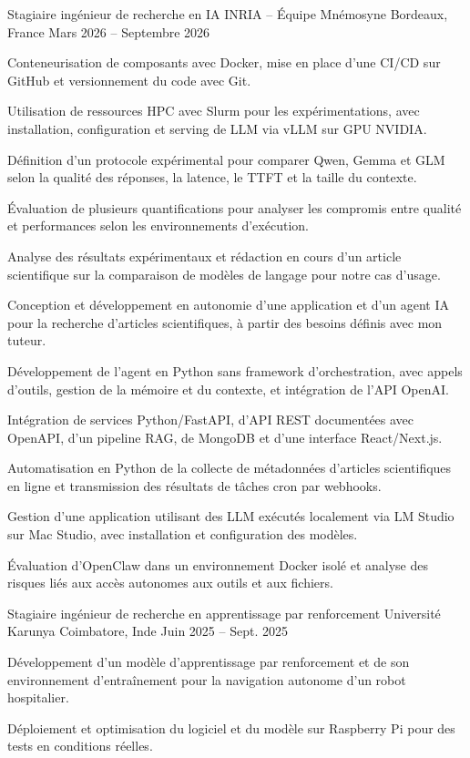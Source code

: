 
\begin{cventries}
  \cventry
    {Stagiaire ingénieur de recherche en IA}
    {INRIA -- Équipe Mnémosyne}
    {Bordeaux, France}
    {Mars 2026 -- Septembre 2026}
    {
      \begin{cvitems}
        \item {Conteneurisation de composants avec Docker, mise en place d’une CI/CD sur GitHub et versionnement du code avec Git.}
        \item {Utilisation de ressources HPC avec Slurm pour les expérimentations, avec installation, configuration et serving de LLM via vLLM sur GPU NVIDIA.}
        \item {Définition d’un protocole expérimental pour comparer Qwen, Gemma et GLM selon la qualité des réponses, la latence, le TTFT et la taille du contexte.}
        \item {Évaluation de plusieurs quantifications pour analyser les compromis entre qualité et performances selon les environnements d’exécution.}
        \item {Analyse des résultats expérimentaux et rédaction en cours d’un article scientifique sur la comparaison de modèles de langage pour notre cas d’usage.}
        \item {Conception et développement en autonomie d’une application et d’un agent IA pour la recherche d’articles scientifiques, à partir des besoins définis avec mon tuteur.}
        \item {Développement de l’agent en Python sans framework d’orchestration, avec appels d’outils, gestion de la mémoire et du contexte, et intégration de l’API OpenAI.}
        \item {Intégration de services Python/FastAPI, d’API REST documentées avec OpenAPI, d’un pipeline RAG, de MongoDB et d’une interface React/Next.js.}
        \item {Automatisation en Python de la collecte de métadonnées d’articles scientifiques en ligne et transmission des résultats de tâches cron par webhooks.}
        \item {Gestion d’une application utilisant des LLM exécutés localement via LM Studio sur Mac Studio, avec installation et configuration des modèles.}
        \item {Évaluation d’OpenClaw dans un environnement Docker isolé et analyse des risques liés aux accès autonomes aux outils et aux fichiers.}
      \end{cvitems}
    }

  \cventry
    {Stagiaire ingénieur de recherche en apprentissage par renforcement}
    {Université Karunya}
    {Coimbatore, Inde}
    {Juin 2025 -- Sept. 2025}
    {
      \begin{cvitems}
        \item {Développement d’un modèle d’apprentissage par renforcement et de son environnement d’entraînement pour la navigation autonome d’un robot hospitalier.}
        \item {Déploiement et optimisation du logiciel et du modèle sur Raspberry Pi pour des tests en conditions réelles.}
      \end{cvitems}
    }
\end{cventries}
